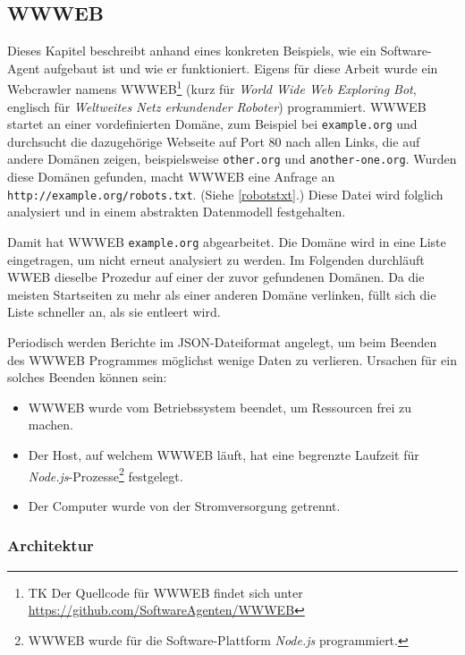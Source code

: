 \subsection{WWWEB}
\label{sub:wwweb}

Dieses Kapitel beschreibt anhand eines konkreten Beispiels, wie ein
Software-Agent aufgebaut ist und wie er funktioniert. Eigens für diese Arbeit
wurde ein Webcrawler namens WWWEB\footnote{TK Der Quellcode für WWWEB findet
sich unter \url{https://github.com/SoftwareAgenten/WWWEB}} (kurz für
\emph{World Wide Web Exploring Bot}, englisch für \emph{Weltweites Netz
erkundender Roboter}) programmiert. WWWEB startet an einer vordefinierten
Domäne, zum Beispiel bei \texttt{example.org} und durchsucht die dazugehörige
Webseite auf Port 80 nach allen Links, die auf andere Domänen zeigen,
beispielsweise \texttt{other.org} und \texttt{another-one.org}. Wurden diese
Domänen gefunden, macht WWWEB eine Anfrage an
\texttt{http://example.org/robots.txt}. (Siehe \ref{robotstxt}.) Diese Datei wird
folglich analysiert und in einem abstrakten Datenmodell festgehalten.

Damit hat WWWEB \texttt{example.org} abgearbeitet. Die Domäne wird in eine
Liste eingetragen, um nicht erneut analysiert zu werden. Im Folgenden
durchläuft WWEB dieselbe Prozedur auf einer der zuvor gefundenen Domänen. Da
die meisten Startseiten zu mehr als einer anderen Domäne verlinken, füllt sich
die Liste schneller an, als sie entleert wird.

Periodisch werden Berichte im JSON-Dateiformat angelegt, um beim Beenden des
WWWEB Programmes möglichst wenige Daten zu verlieren. Ursachen für ein solches
Beenden können sein:

\begin{itemize}
\item
  WWWEB wurde vom Betriebssystem beendet, um Ressourcen frei zu machen.
\item
  Der Host, auf welchem WWWEB läuft, hat eine begrenzte Laufzeit für
  \emph{Node.js}-Prozesse\footnote{WWWEB wurde für die Software-Plattform
  \emph{Node.js} programmiert.} festgelegt.
\item
  Der Computer wurde von der Stromversorgung getrennt.
\end{itemize}

\subsubsection{Architektur}
\label{ssub:wwweb_architektur}

